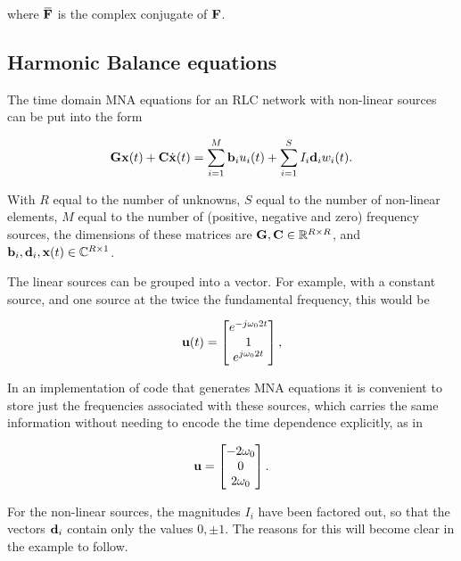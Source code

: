where \( \overbar{\BF} \) is the complex conjugate of \( \mathbf{F} \).

\subsection{Harmonic Balance equations}

The time domain MNA equations for an RLC network with non-linear sources can be put into the form

\begin{equation}\label{eqn:ece1254projectReport:420}
\BG \Bx(t) + \BC \dot{\Bx}(t) = \sum_{i = 1}^M \Bb_i u_i(t) + \sum_{i = 1}^S I_i \Bd_i w_i(t).
\end{equation}

With \( R \) equal to the number of unknowns, \( S \) equal to the number of non-linear elements, \( M \) equal to the number of (positive, negative and zero) frequency sources, the dimensions of these matrices are \( \mathbf{G}, \mathbf{C} \in \text{$\mathbb{R}^{R \times R}$} \), and \( \mathbf{b}_i, \mathbf{d}_i, \mathbf{x}(t) \in \text{$\mathbb{C}^{R \times 1}$} \).

The linear sources can be grouped into a vector.
For example, with a constant source, and one source at the twice the fundamental frequency, this would be

\begin{equation}\label{eqn:ece1254projectReport:440}
\Bu(t) =
\begin{bmatrix}
e^{ -j \omega_0 2 t } \\
1 \\
e^{ j \omega_0 2 t }
\end{bmatrix},
\end{equation}

In an implementation of code that generates MNA equations it is convenient to store just the frequencies associated with these sources, which carries the same information without needing to encode the time dependence explicitly, as in

\begin{equation}\label{eqn:ece1254projectReport:460}
\Bu =
\begin{bmatrix}
- 2 \omega_0 \\
0 \\
2 \omega_0
\end{bmatrix}.
\end{equation}

For the non-linear sources, the magnitudes \( I_i \) have been factored out, so that the vectors \( \mathbf{d}_i \) contain only the values \( 0, \pm 1 \).
The reasons for this will become clear in the example to follow.

